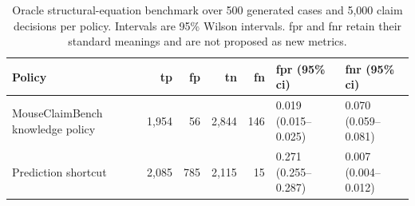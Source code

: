 \begin{table}[t!]
\centering
\caption{Oracle structural-equation benchmark over 500 generated cases and
5,000 claim decisions per policy. Intervals are 95\% Wilson intervals. \acs{fpr} and
\acs{fnr} retain their standard meanings and are not proposed as new metrics.}
\label{tab:oracle-policy-comparison}
\small
\renewcommand{\arraystretch}{1.13}
\begin{tabularx}{\textwidth}{@{}p{}rrrrYY@{}}
\toprule
Policy & \acs{tp} & \acs{fp} & \acs{tn} & \acs{fn} & \acs{fpr} (95\% \acs{ci}) & \acs{fnr} (95\% \acs{ci}) \\
\midrule
MouseClaimBench knowledge policy & 1,954 & 56 & 2,844 & 146 & 0.019 (0.015--0.025) & 0.070 (0.059--0.081) \\
Prediction shortcut & 2,085 & 785 & 2,115 & 15 & 0.271 (0.255--0.287) & 0.007 (0.004--0.012) \\
\bottomrule
\end{tabularx}
\end{table}
